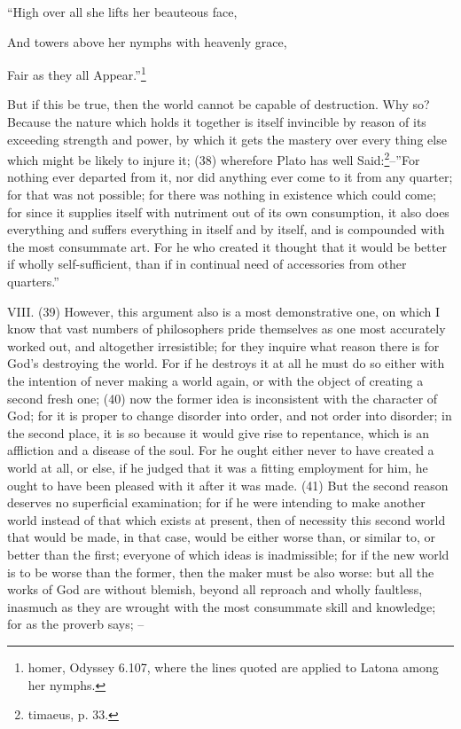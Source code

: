 ``High over all she lifts her beauteous face,

And towers above her nymphs with heavenly grace,

Fair as they all Appear.''\footnote{homer, Odyssey 6.107, where the lines quoted are applied to Latona among her
nymphs.}

But if this be true, then the world cannot be capable of destruction. Why so? Because the nature
which holds it together is itself invincible by reason of its exceeding strength and power, by which it
gets the mastery over every thing else which might be likely to injure it; (38) wherefore Plato has
well Said:\footnote{timaeus, p. 33.}--''For nothing ever departed from it, nor did anything ever come to it
from any quarter; for that was not possible; for there was nothing in existence which could come;
for since it supplies itself with nutriment out of its own consumption, it also does everything and
suffers everything in itself and by itself, and is compounded with the most consummate art. For he
who created it thought that it would be better if wholly self-sufficient, than if in continual need of
accessories from other quarters.''

VIII. (39) However, this argument also is a most demonstrative one, on which I know that vast
numbers of philosophers pride themselves as one most accurately worked out, and altogether
irresistible; for they inquire what reason there is for God's destroying the world. For if he destroys
it at all he must do so either with the intention of never making a world again, or with the object of
creating a second fresh one; (40) now the former idea is inconsistent with the character of God;
for it is proper to change disorder into order, and not order into disorder; in the second place, it is
so because it would give rise to repentance, which is an affliction and a disease of the soul. For he
ought either never to have created a world at all, or else, if he judged that it was a fitting
employment for him, he ought to have been pleased with it after it was made. (41) But the second
reason deserves no superficial examination; for if he were intending to make another world instead
of that which exists at present, then of necessity this second world that would be made, in that
case, would be either worse than, or similar to, or better than the first; everyone of which ideas is
inadmissible; for if the new world is to be worse than the former, then the maker must be also
worse: but all the works of God are without blemish, beyond all reproach and wholly faultless,
inasmuch as they are wrought with the most consummate skill and knowledge; for as the proverb
says; --

